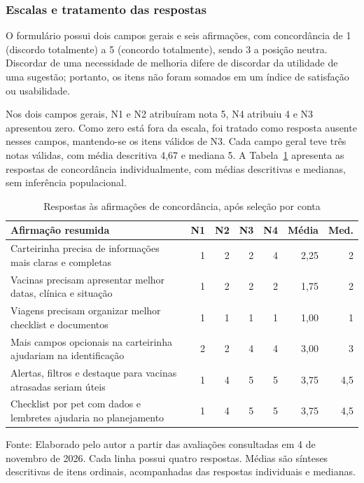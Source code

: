 \documentclass{UNESC}
\begin{document}
\subsubsection{Escalas e tratamento das respostas}

O formulário possui dois campos gerais e seis afirmações, com concordância de 1 (discordo totalmente) a 5 (concordo totalmente), sendo 3 a posição neutra. Discordar de uma necessidade de melhoria difere de discordar da utilidade de uma sugestão; portanto, os itens não foram somados em um índice de satisfação ou usabilidade.

Nos dois campos gerais, N1 e N2 atribuíram nota 5, N4 atribuiu 4 e N3 apresentou zero. Como zero está fora da escala, foi tratado como resposta ausente nesses campos, mantendo-se os itens válidos de N3. Cada campo geral teve três notas válidas, com média descritiva 4,67 e mediana 5. A Tabela~\ref{tab:likert_novembro} apresenta as respostas de concordância individualmente, com médias descritivas e medianas, sem inferência populacional.

\begin{table}[htbp]
\centering
\caption{Respostas às afirmações de concordância, após seleção por conta}
\label{tab:likert_novembro}
\small
\setlength{\tabcolsep}{4pt}
\renewcommand{\arraystretch}{1.15}
\begin{tabular}{@{}p{}rrrrrr@{}}
\hline
\textbf{Afirmação resumida} & \textbf{N1} & \textbf{N2} & \textbf{N3} & \textbf{N4} & \textbf{Média} & \textbf{Med.} \\
\hline
Carteirinha precisa de informações mais claras e completas & 1 & 2 & 2 & 4 & 2,25 & 2 \\
Vacinas precisam apresentar melhor datas, clínica e situação & 1 & 2 & 2 & 2 & 1,75 & 2 \\
Viagens precisam organizar melhor checklist e documentos & 1 & 1 & 1 & 1 & 1,00 & 1 \\
Mais campos opcionais na carteirinha ajudariam na identificação & 2 & 2 & 4 & 4 & 3,00 & 3 \\
Alertas, filtros e destaque para vacinas atrasadas seriam úteis & 1 & 4 & 5 & 5 & 3,75 & 4,5 \\
Checklist por pet com dados e lembretes ajudaria no planejamento & 1 & 4 & 5 & 5 & 3,75 & 4,5 \\
\hline
\end{tabular}
\par\vspace{2pt}
{\footnotesize\raggedright Fonte: Elaborado pelo autor a partir das avaliações consultadas em 4 de novembro de 2026. Cada linha possui quatro respostas. Médias são sínteses descritivas de itens ordinais, acompanhadas das respostas individuais e medianas.\par}
\end{table}
\end{document}

